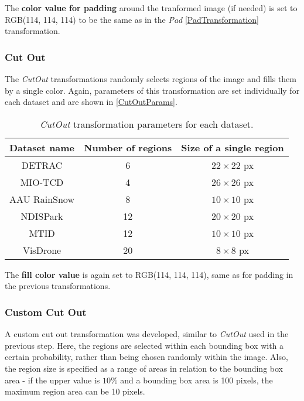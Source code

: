 The \textbf{color value for padding} around the tranformed image (if needed)
is set to RGB(114, 114, 114) to be the same as in the \textit{Pad} \ref{PadTransformation} transformation.

\subsubsection*{Cut Out}

The \textit{CutOut} transformations randomly selects regions of the image and fills them by a single color. Again,
parameters of this transformation are set individually for each dataset and are shown in \autoref{CutOutParams}.

\begin{table}[h]
\centering
\label{CutOutParams}
\begin{tabular}{|c|c|c|}
    \hline
    Dataset name & Number of regions & Size of a single region \\
    \hline
    DETRAC       &  6 & $22 \times 22$ px \\
    MIO-TCD      &  4 & $26 \times 26$ px \\
    AAU RainSnow &  8 & $10 \times 10$ px \\
    NDISPark     & 12 & $20 \times 20$ px \\
    MTID         & 12 & $10 \times 10$ px \\
    VisDrone     & 20 & $8 \times 8$ px \\
    \hline
\end{tabular}
\caption{\textit{CutOut} transformation parameters for each dataset.}
\end{table}

The \textbf{fill color value} is again set to RGB(114, 114, 114), same as for
padding in the previous transformations.

\subsubsection*{Custom Cut Out}

A custom cut out transformation was developed, similar to \textit{CutOut} used
in the previous step. Here, the regions are selected within each bounding box
with a certain probability, rather than being chosen randomly within the image.
Also, the region size is specified as a range of areas in relation to the
bounding box area - if the upper value is $10\%$ and a bounding box area is 100
pixels, the maximum region area can be 10 pixels.

